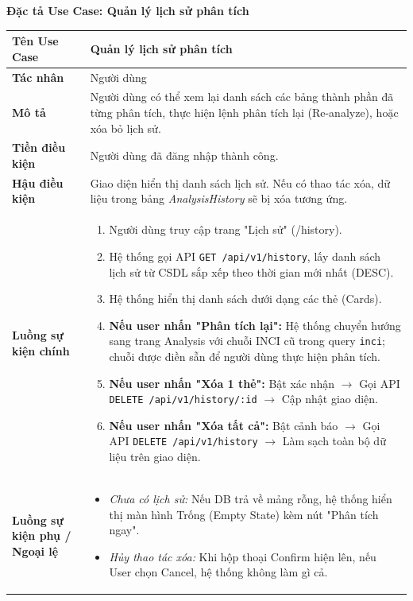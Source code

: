 \documentclass[12pt,a4paper]{article}
\begin{document}
\vspace{0.5cm}
\textbf{Đặc tả Use Case: Quản lý lịch sử phân tích}

\begin{center}
\renewcommand{\arraystretch}{1.4}
\begin{tabular}{|p{4cm}|p{10cm}|}
\hline
\rowcolor{blue!15}
\textbf{Tên Use Case} & \textbf{Quản lý lịch sử phân tích} \\ \hline
\textbf{Tác nhân} & Người dùng \\ \hline
\textbf{Mô tả} & Người dùng có thể xem lại danh sách các bảng thành phần đã từng phân tích, thực hiện lệnh phân tích lại (Re-analyze), hoặc xóa bỏ lịch sử. \\ \hline
\textbf{Tiền điều kiện} & Người dùng đã đăng nhập thành công. \\ \hline
\textbf{Hậu điều kiện} & Giao diện hiển thị danh sách lịch sử. Nếu có thao tác xóa, dữ liệu trong bảng \textit{AnalysisHistory} sẽ bị xóa tương ứng. \\ \hline
\textbf{Luồng sự kiện chính} & 
\begin{enumerate}
    \item Người dùng truy cập trang "Lịch sử" (/history).
    \item Hệ thống gọi API \texttt{GET /api/v1/history}, lấy danh sách lịch sử từ CSDL sắp xếp theo thời gian mới nhất (DESC).
    \item Hệ thống hiển thị danh sách dưới dạng các thẻ (Cards).
    \item \textbf{Nếu user nhấn "Phân tích lại":} Hệ thống chuyển hướng sang trang Analysis với chuỗi INCI cũ trong query \texttt{inci}; chuỗi được điền sẵn để người dùng thực hiện phân tích.
    \item \textbf{Nếu user nhấn "Xóa 1 thẻ":} Bật xác nhận $\rightarrow$ Gọi API \texttt{DELETE /api/v1/history/:id} $\rightarrow$ Cập nhật giao diện.
    \item \textbf{Nếu user nhấn "Xóa tất cả":} Bật cảnh báo $\rightarrow$ Gọi API \texttt{DELETE /api/v1/history} $\rightarrow$ Làm sạch toàn bộ dữ liệu trên giao diện.
\end{enumerate} \\ \hline
\textbf{Luồng sự kiện phụ / Ngoại lệ} & 
\begin{itemize}
    \item \textit{Chưa có lịch sử:} Nếu DB trả về mảng rỗng, hệ thống hiển thị màn hình Trống (Empty State) kèm nút "Phân tích ngay".
    \item \textit{Hủy thao tác xóa:} Khi hộp thoại Confirm hiện lên, nếu User chọn Cancel, hệ thống không làm gì cả.
\end{itemize} \\ \hline
\end{tabular}
\end{center}
\end{document}

